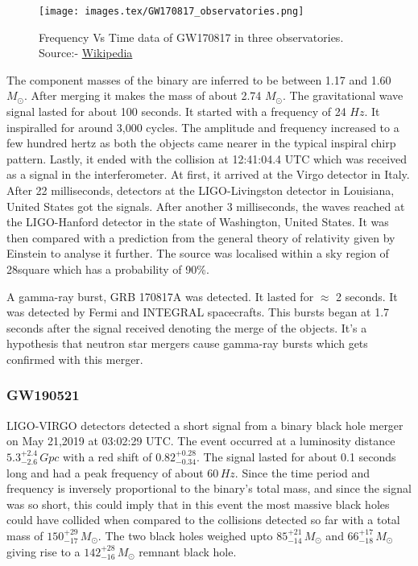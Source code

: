 \begin{figure}[h]
    \centering
    \texttt{[image: images.tex/GW170817\_observatories.png]}
    \caption{Frequency Vs Time data of GW170817 in three observatories. Source:- \href{https://en.wikipedia.org/wiki/GW170817}{Wikipedia}}
\end{figure}

The component masses of the binary are inferred to be between 1.17 and 1.60 $M_\odot$. After merging it makes the mass of about 2.74 $M_\odot$. The gravitational wave signal lasted for about 100 seconds. It started with a frequency of 24 $Hz$. It  inspiralled for around 3,000 cycles. The amplitude and frequency increased to a few hundred hertz as both the objects came nearer in the typical inspiral chirp pattern. Lastly, it ended with the collision at 12:41:04.4 UTC which was received as a signal in the interferometer. At first, it arrived at the Virgo detector in Italy. After 22 milliseconds, detectors at the LIGO-Livingston detector in Louisiana, United States got the signals. After another 3 milliseconds, the waves reached at the LIGO-Hanford detector in the state of Washington, United States. It was then compared with a prediction from the general theory of relativity given by Einstein to analyse it further. The source was localised within a sky region of 28\degree square which has a probability of 90\%.

A gamma-ray burst, GRB 170817A was detected. It lasted for $\approx$ 2 seconds. It was detected by Fermi and INTEGRAL spacecrafts. This bursts began at 1.7 seconds after the signal received denoting the merge of the objects. It's a hypothesis that neutron star mergers cause gamma-ray bursts which gets confirmed with this merger.

\pagebreak

\subsubsection{GW190521}

LIGO-VIRGO detectors detected a short signal from a binary black hole merger
on May 21,2019 at 03:02:29 UTC. The event occurred at a luminosity distance $5.3_{-2.6}^{+2.4}\,Gpc$ with a red shift of $0.82_{-0.34}^{+0.28}$. The signal lasted for about 0.1 seconds long and had a peak frequency of about $60\,Hz$. Since the time period and frequency is inversely proportional to the binary’s total mass, and since the signal was so short, this could imply that in this event the most massive black holes could have collided when compared to the collisions detected so far with a total mass of $150_{-17}^{+29}\,M_\odot$. The two black holes weighed upto $85_{-14}^{+21}\, M_\odot$ and $66_{-18}^{+17} \,M_\odot$ giving rise to a $142_{-16}^{+28}\, M_\odot$ remnant black hole. \cite{GW190521_1}

